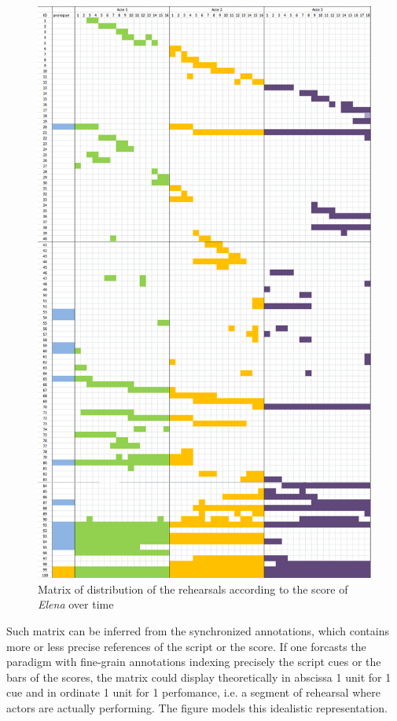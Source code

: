 \documentclass[conference]{IEEEtran}
\begin{document}
\begin{figure}[htb!]
  \centering
  \includegraphics[width=0.60\columnwidth]{elenamatrix}
  \caption{Matrix of distribution of the rehearsals according to the score of \emph{Elena} over time}
  \label{fig:elenamatrix}
\end{figure}

Such matrix can be inferred from the synchronized annotations, which contains more or less precise references of the script or the score. If one forcasts the paradigm with fine-grain annotations indexing precisely the script cues or the bars of the scores, the matrix could display theoretically in abscissa 1 unit for 1 cue and in ordinate 1 unit for 1 perfomance, i.e. a segment of rehearsal where actors are actually performing. The figure models this idealistic representation.
\end{document}
